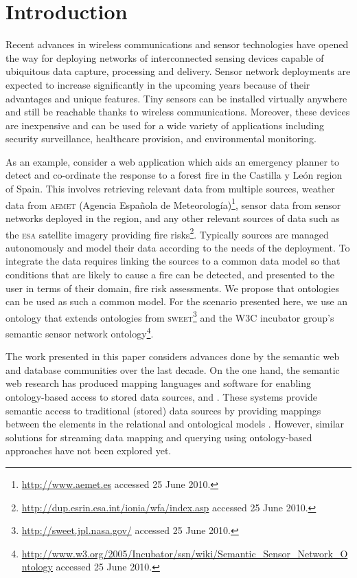 \section{Introduction}
\label{intro}

Recent advances in wireless communications and sensor technologies have opened the way for deploying networks of interconnected sensing devices capable of ubiquitous data capture, processing and delivery.
Sensor network deployments are expected to increase significantly in the upcoming years because of their advantages and unique features.
Tiny sensors can be installed virtually anywhere and still be reachable thanks to wireless communications. 
Moreover, these devices are inexpensive and can be used for a wide variety of applications including security surveillance, healthcare provision, and environmental monitoring.

As an example, consider a web application which aids an emergency planner to detect and co-ordinate the response to a forest fire in the Castilla y Le\'on region of Spain. 
This involves retrieving relevant data from multiple sources, \eg weather data from \textsc{aemet} (Agencia Espa\~nola de Meteorolog\'ia)\footnote{\url{http://www.aemet.es} accessed 25 June 2010.}, sensor data from sensor networks deployed in the region, and any other relevant sources of data such as the \textsc{esa} satellite imagery providing fire risks\footnote{\url{http://dup.esrin.esa.int/ionia/wfa/index.asp} accessed 25 June 2010.}. 
Typically sources are managed autonomously and model their data according to the needs of the deployment.
To integrate the data requires linking the sources to a common data model so that conditions that are likely to cause a fire can be detected, and presented to the user in terms of their domain, \eg fire risk assessments.
We propose that ontologies can be used as such a common model.
For the scenario presented here, we use an ontology that extends ontologies from \textsc{sweet}\footnote{\url{http://sweet.jpl.nasa.gov/} accessed 25 June 2010.} and the W3C incubator group's semantic sensor network ontology\footnote{\url{http://www.w3.org/2005/Incubator/ssn/wiki/Semantic_Sensor_Network_Ontology} accessed 25 June 2010.}.

The work presented in this paper considers advances done by the semantic web and database communities over the last decade. On the one hand, the semantic web research has produced mapping languages and software for enabling ontology-based access to stored data sources, \eg \rtwoo \cite{Barrasa_04} and \dtworq \cite{Bizer_07}.
These systems provide semantic access to traditional (stored) data sources by providing mappings
between the elements in the relational and ontological models \cite{Sahoo_09}.
However, similar solutions for streaming data mapping and querying using ontology-based approaches have not been explored yet.

